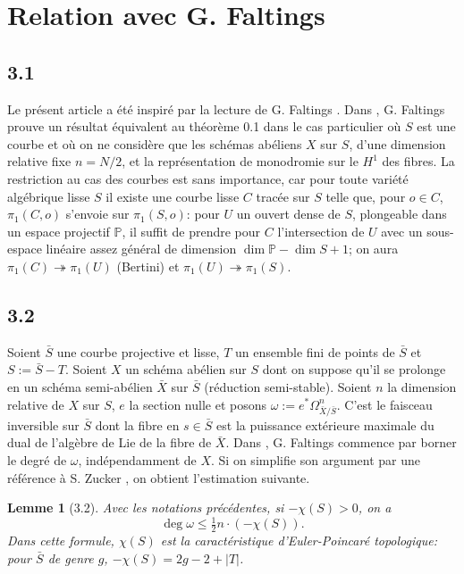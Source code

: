 \documentclass[12pt,a4paper]{article}
\theoremstyle{plain}
\newtheorem{lemma}{Lemme}[section]
\theoremstyle{definition}
\newcommand{\PP}{\mathbb{P}}
\begin{document}
\section{Relation avec G. Faltings \cite{Faltings}}

\subsection*{3.1}
Le pr\'{e}sent article a \'{e}t\'{e} inspir\'{e} par la lecture de G. Faltings \cite{Faltings}. Dans \cite{Faltings}, G. Faltings prouve un r\'{e}sultat \'{e}quivalent au th\'{e}or\`{e}me 0.1 dans le cas particulier o\`{u} $S$ est une courbe et o\`{u} on ne consid\`{e}re que les sch\'{e}mas ab\'{e}liens $X$ sur $S$, d'une dimension relative fixe $n = N/2$, et la repr\'{e}sentation de monodromie sur le $H^{1}$ des fibres. La restriction au cas des courbes est sans importance, car pour toute vari\'{e}t\'{e} alg\'{e}brique lisse $S$ il existe une courbe lisse $C$ trac\'{e}e sur $S$ telle que, pour $o \in C$, $\pi_{1}(C,o)$ s'envoie sur $\pi_{1}(S,o)$: pour $U$ un ouvert dense de $S$, plongeable dans un espace projectif $\PP$, il suffit de prendre pour $C$ l'intersection de $U$ avec un sous-espace lin\'{e}aire assez g\'{e}n\'{e}ral de dimension $\dim \PP - \dim S + 1$; on aura $\pi_{1}(C) \twoheadrightarrow \pi_{1}(U)$ (Bertini) et $\pi_{1}(U) \twoheadrightarrow \pi_{1}(S)$.

\subsection*{3.2}
Soient $\bar{S}$ une courbe projective et lisse, $T$ un ensemble fini de points de $\bar{S}$ et $S := \bar{S} - T$. Soient $X$ un sch\'{e}ma ab\'{e}lien sur $S$ dont on suppose qu'il se prolonge en un sch\'{e}ma semi-ab\'{e}lien $\bar{X}$ sur $\bar{S}$ (r\'{e}duction semi-stable). Soient $n$ la dimension relative de $X$ sur $S$, $e$ la section nulle et posons $\omega := e^{*}\Omega^{n}_{\bar{X}/\bar{S}}$. C'est le faisceau inversible sur $\bar{S}$ dont la fibre en $s \in \bar{S}$ est la puissance ext\'{e}rieure maximale du dual de l'alg\`{e}bre de Lie de la fibre de $\bar{X}$. Dans \cite{Faltings}, G. Faltings commence par borner le degr\'{e} de $\omega$, ind\'{e}pendamment de $X$. Si on simplifie son argument par une r\'{e}f\'{e}rence \`{a} S. Zucker \cite{Zucker}, on obtient l'estimation suivante.

\begin{lemma}[3.2]
Avec les notations pr\'{e}c\'{e}dentes, si $-\chi(S) > 0$, on a
\[
\deg \omega \leq \tfrac{1}{2} n \cdot (-\chi(S)).
\]
Dans cette formule, $\chi(S)$ est la caract\'{e}ristique d'Euler-Poincar\'{e} topologique: pour $\bar{S}$ de genre $g$, $-\chi(S) = 2g - 2 + |T|$.
\end{lemma}
\end{document}
